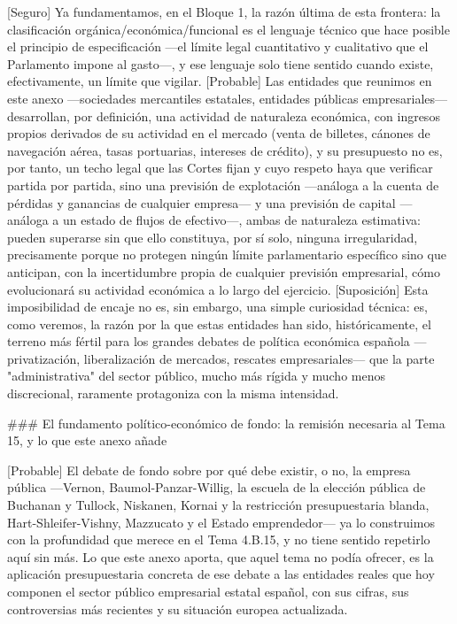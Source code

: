 \documentclass[10pt,a4paper]{article}
\newcounter{anexo}
\begin{document}
[Seguro] Ya fundamentamos, en el Bloque 1, la razón última de esta frontera: la clasificación orgánica/económica/funcional es el lenguaje técnico que hace posible el principio de especificación —el límite legal cuantitativo y cualitativo que el Parlamento impone al gasto—, y ese lenguaje solo tiene sentido cuando existe, efectivamente, un límite que vigilar. [Probable] Las entidades que reunimos en este anexo —sociedades mercantiles estatales, entidades públicas empresariales— desarrollan, por definición, una actividad de naturaleza económica, con ingresos propios derivados de su actividad en el mercado (venta de billetes, cánones de navegación aérea, tasas portuarias, intereses de crédito), y su presupuesto no es, por tanto, un techo legal que las Cortes fijan y cuyo respeto haya que verificar partida por partida, sino una previsión de explotación —análoga a la cuenta de pérdidas y ganancias de cualquier empresa— y una previsión de capital —análoga a un estado de flujos de efectivo—, ambas de naturaleza estimativa: pueden superarse sin que ello constituya, por sí solo, ninguna irregularidad, precisamente porque no protegen ningún límite parlamentario específico sino que anticipan, con la incertidumbre propia de cualquier previsión empresarial, cómo evolucionará su actividad económica a lo largo del ejercicio. [Suposición] Esta imposibilidad de encaje no es, sin embargo, una simple curiosidad técnica: es, como veremos, la razón por la que estas entidades han sido, históricamente, el terreno más fértil para los grandes debates de política económica española —privatización, liberalización de mercados, rescates empresariales— que la parte "administrativa" del sector público, mucho más rígida y mucho menos discrecional, raramente protagoniza con la misma intensidad.

### El fundamento político-económico de fondo: la remisión necesaria al Tema 15, y lo que este anexo añade

[Probable] El debate de fondo sobre por qué debe existir, o no, la empresa pública —Vernon, Baumol-Panzar-Willig, la escuela de la elección pública de Buchanan y Tullock, Niskanen, Kornai y la restricción presupuestaria blanda, Hart-Shleifer-Vishny, Mazzucato y el Estado emprendedor— ya lo construimos con la profundidad que merece en el Tema 4.B.15, y no tiene sentido repetirlo aquí sin más. Lo que este anexo aporta, que aquel tema no podía ofrecer, es la aplicación presupuestaria concreta de ese debate a las entidades reales que hoy componen el sector público empresarial estatal español, con sus cifras, sus controversias más recientes y su situación europea actualizada.
\end{document}
